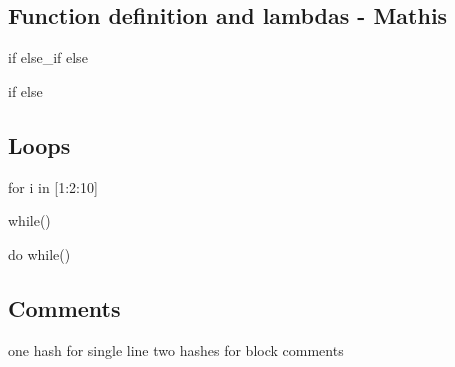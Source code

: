 \subsection{Function definition and lambdas - Mathis}

if {}
else\_if {}
else{}

if {}
else{}


\subsection{Loops}
for i in [1:2:10]{}

while(){}

do{}
while()



\subsection{Comments}
one hash for single line
two hashes for block comments


\label{sect:core}
